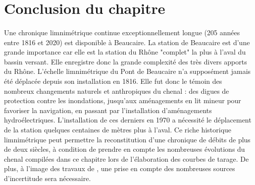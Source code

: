 \documentclass[11pt]{article}
\begin{document}
\FloatBarrier
\section{Conclusion du chapitre}

	\paragraph{} Une chronique limnimétrique continue exceptionnellement longue (205 années entre 1816 et 2020) est disponible à Beaucaire. La station de Beaucaire est d'une grande importance car elle est la station du Rhône "complet" la plus à l'aval du bassin versant. Elle enregistre donc la grande complexité des très divers apports du Rhône. L'échelle limnimétrique du Pont de Beaucaire n'a supposément jamais été déplacée depuis son installation en 1816. Elle fut donc le témoin des nombreux changements naturels et anthropiques du chenal : des digues de protection contre les inondations, jusqu'aux aménagements en lit mineur pour favoriser la navigation, en passant par l'installation d'aménagements hydroélectriques. L'installation de ces derniers en 1970 a nécessité le déplacement de la station quelques centaines de mètres plus à l'aval. Ce riche historique limnimétrique peut permettre la reconstitution d'une chronique de débits de plus de deux siècles, à condition de prendre en compte les nombreuses évolutions du chenal compilées dans ce chapitre lors de l'élaboration des courbes de tarage. De plus, à l'image des travaux de \citet{bard_actualisation_2018}, une prise en compte des nombreuses sources d'incertitude sera nécessaire. 
	
\end{document}
